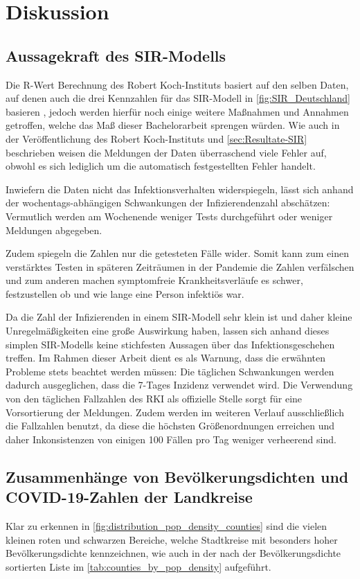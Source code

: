 \chapter{Diskussion}\label{chap:Diskussion}
\section{Aussagekraft des SIR-Modells}
Die R-Wert Berechnung des Robert Koch-Instituts basiert auf den selben Daten, auf denen auch die drei Kennzahlen für das SIR-Modell in \autoref{fig:SIR_Deutschland} basieren \autocite{RKI_Bulletin}, jedoch werden hierfür noch einige weitere Maßnahmen und Annahmen getroffen, welche das Maß dieser Bachelorarbeit sprengen würden.\autocite{RKI_Bulletin}
Wie auch in der Veröffentlichung des Robert Koch-Instituts \autocite{RKI_Bulletin} und \autoref{sec:Resultate-SIR} beschrieben weisen die Meldungen der Daten überraschend viele Fehler auf, obwohl es sich lediglich um die automatisch festgestellten Fehler handelt.

Inwiefern die Daten nicht das Infektionsverhalten widerspiegeln, lässt sich anhand der wochentags-abhängigen Schwankungen der Infizierendenzahl abschätzen: Vermutlich werden am Wochenende weniger Tests durchgeführt oder weniger Meldungen abgegeben. 

Zudem spiegeln die Zahlen nur die getesteten Fälle wider. Somit kann zum einen verstärktes Testen in späteren Zeiträumen in der Pandemie die Zahlen verfälschen und zum anderen machen symptomfreie Krankheitsverläufe es schwer, festzustellen ob und wie lange eine Person infektiös war.

Da die Zahl der Infizierenden in einem SIR-Modell sehr klein ist und daher kleine Unregelmäßigkeiten eine große Auswirkung haben, lassen sich anhand dieses simplen SIR-Modells keine stichfesten Aussagen über das Infektionsgeschehen treffen.
Im Rahmen dieser Arbeit dient es als Warnung, dass die erwähnten Probleme stets beachtet werden müssen:
Die täglichen Schwankungen werden dadurch ausgeglichen, dass die 7-Tages Inzidenz verwendet wird. Die Verwendung von den täglichen Fallzahlen des RKI als offizielle Stelle sorgt für eine Vorsortierung der Meldungen. Zudem werden im weiteren Verlauf ausschließlich die Fallzahlen benutzt, da diese die höchsten Größenordnungen erreichen und daher Inkonsistenzen von einigen 100 Fällen pro Tag weniger verheerend sind.

\section{Zusammenhänge von Bevölkerungsdichten und COVID-19-Zahlen der Landkreise}\label{sec:discussion:pop_density_counties}
Klar zu erkennen in \autoref{fig:distribution_pop_density_counties} sind die vielen kleinen roten und schwarzen Bereiche, welche Stadtkreise mit besonders hoher Bevölkerungsdichte kennzeichnen, wie auch in der nach der Bevölkerungsdichte sortierten Liste im \autoref{tab:counties_by_pop_density} aufgeführt.

